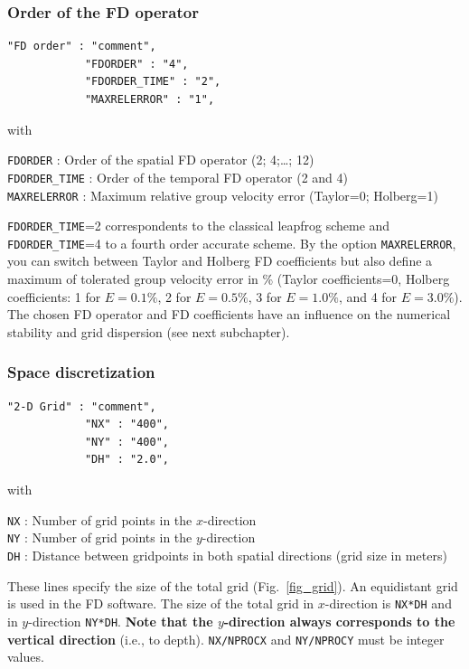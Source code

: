 \subsubsection{Order of the FD operator}
\begin{verbatim}
"FD order" : "comment",
            "FDORDER" : "4",
            "FDORDER_TIME" : "2",
            "MAXRELERROR" : "1",
\end{verbatim}

with

\texttt{FDORDER} : Order of the spatial FD operator (2; 4;\dots; 12)\\
\texttt{FDORDER\_TIME} : Order of the temporal FD operator (2 and 4)\\
\texttt{MAXRELERROR} : Maximum relative group velocity error (Taylor=0; Holberg=1)

\texttt{FDORDER\_TIME}=2 correspondents to the classical leapfrog scheme and \texttt{FDORDER\_TIME}=4 to a fourth order accurate scheme. By the option \texttt{MAXRELERROR}, you can switch between Taylor and Holberg FD coefficients but also define a maximum of tolerated group velocity error in \% (Taylor coefficients=0, Holberg coefficients: 1 for $E=0.1\%$, 2 for $E=0.5\%$, 3 for $E=1.0\%$, and 4 for $E=3.0\%$). The chosen FD operator and FD coefficients have an influence on the numerical stability and grid dispersion (see next subchapter).

\subsubsection{Space discretization}
\begin{verbatim}
"2-D Grid" : "comment",
            "NX" : "400",
            "NY" : "400",
            "DH" : "2.0",
\end{verbatim}

with

\texttt{NX} : Number of grid points in the $x$-direction \\
\texttt{NY} : Number of grid points in the $y$-direction\\
\texttt{DH} : Distance between gridpoints in both spatial directions (grid size in meters)

These lines specify the size of the total grid (Fig.~\ref{fig_grid}). An equidistant grid is used in the FD software. The size of the total grid in $x$-direction is \texttt{NX*DH} and in $y$-direction \texttt{NY*DH}. \textbf{Note that the $y$-direction always corresponds to the vertical direction} (i.e., to depth). \texttt{NX/NPROCX} and \texttt{NY/NPROCY} must be integer values.

